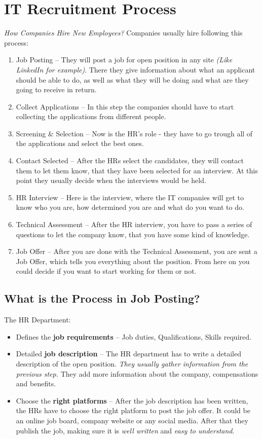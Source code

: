\section{IT Recruitment Process}
\textit{How Companies Hire New Employees?}
Companies usually hire following this process:
\begin{enumerate}
    \item Job Posting -- They will post a job for open position in any site \textit{(Like LinkedIn for example)}. There they give information about what an applicant should be able to do, as well as what they will be doing and what are they going to receive in return.
    \item Collect Applications -- In this step the companies should have to start collecting the applications from different people.
    \item Screening \& Selection -- Now is the HR's role - they have to go trough all of the applications and select the best ones.
    \item Contact Selected -- After the HRs select the candidates, they will contact them to let them know, that they have been selected for an interview. At this point they usually decide when the interviews would be held.
    \item HR Interview -- Here is the interview, where the IT companies will get to know who you are, how determined you are and what do you want to do.
    \item Technical Assessment -- After the HR interview, you have to pass a series of questions to let the company know, that you have some kind of knowledge.
    \item Job Offer -- After you are done with the Technical Assessment, you are sent a Job Offer, which tells you everything about the position. From here on you could decide if you want to start working for them or not.
\end{enumerate}

\subsection{What is the Process in Job Posting?}
The HR Department:
\begin{itemize}
    \item Defines the \textbf{job requirements} -- Job duties, Qualifications, Skills required.
    \item Detailed \textbf{job description} -- The HR department has to write a detailed description of the open position. \textit{They usually gather information from the previous step.} They add more information about the company, compensations and benefits.
    \item Choose the \textbf{right platforms} -- After the job description has been written, the HRs have to choose the right platform to post the job offer. It could be an online job board, company website or any social media. After that they publish the job, making sure it is \textit{well written} and \textit{easy to understand}. 
\end{itemize}

